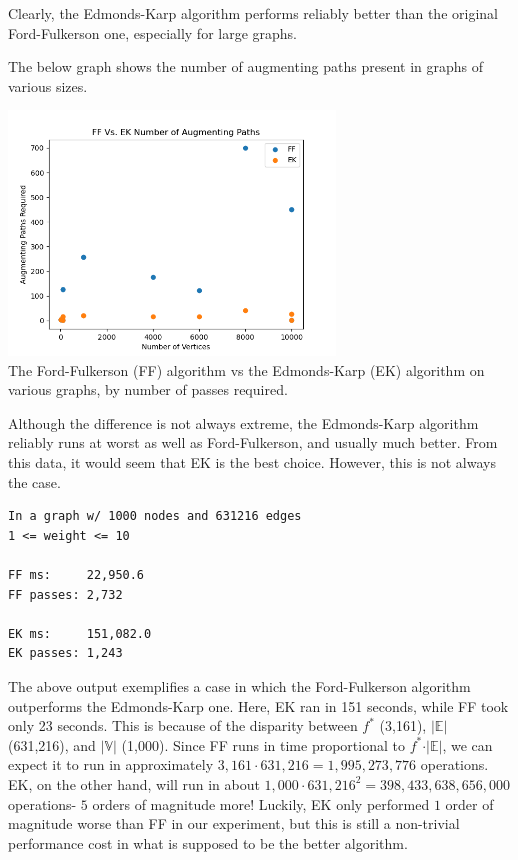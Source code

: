 \documentclass[12pt]{amsart}
\begin{document}
    Clearly, the Edmonds-Karp algorithm performs reliably
    better than the original Ford-Fulkerson one, especially for
    large graphs.

    The below graph shows the number of augmenting paths present
    in graphs of various sizes.

\begin{center}
    \includegraphics[width=0.65\textwidth]
        {mf_passes_comparison.png} \\
    The Ford-Fulkerson (FF) algorithm vs the Edmonds-Karp (EK)
    algorithm on various graphs, by number of passes required.
    \\
    \vskip 1cm
\end{center}

    Although the difference is not always extreme, the
    Edmonds-Karp algorithm reliably runs at worst as well as
    Ford-Fulkerson, and usually much better. From this data, it
    would seem that EK is the best choice. However, this is not
    always the case.

\begin{verbatim}
In a graph w/ 1000 nodes and 631216 edges
1 <= weight <= 10

FF ms:     22,950.6
FF passes: 2,732

EK ms:     151,082.0
EK passes: 1,243

\end{verbatim}

    The above output exemplifies a case in which the
    Ford-Fulkerson algorithm outperforms the Edmonds-Karp one.
    Here, EK ran in 151 seconds, while FF took only 23 seconds.
    This is because of the disparity between $f^*$ (3,161),
    $\vert \mathbb{E} \vert$ (631,216), and
    $\vert \mathbb{V} \vert$ (1,000). Since FF runs in time
    proportional to $f^* \cdot \vert \mathbb{E} \vert$, we can
    expect it to run in approximately
    $3,161 \cdot 631,216 = 1,995,273,776$ operations. EK, on the
    other hand, will run in about
    $1,000 \cdot 631,216^2 = 398,433,638,656,000$ operations-
    $5$ orders of magnitude more! Luckily, EK only performed $1$
    order of magnitude worse than FF in our experiment, but this
    is still a non-trivial performance cost in what is supposed
    to be the better algorithm.
\end{document}
